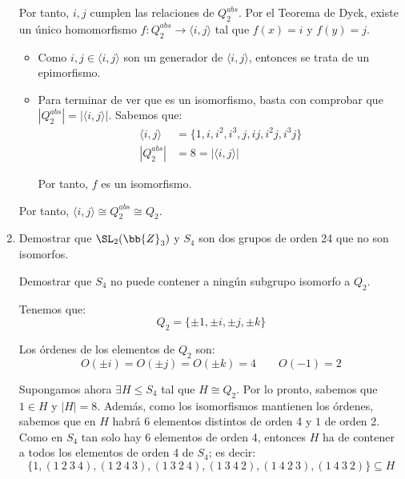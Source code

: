 \begin{ejercicio}
\begin{enumerate}
        Por tanto, $i,j$ cumplen las relaciones de $Q_2^{abs}$. Por el Teorema de Dyck, existe un único homomorfismo $f:Q_2^{abs}\to\langle i,j\rangle$ tal que $f(x)=i$ y $f(y)=j$.
        \begin{itemize}
            \item Como $i,j\in\langle i,j\rangle$ son un generador de $\langle i,j\rangle$, entonces se trata de un epimorfismo.
            \item Para terminar de ver que es un isomorfismo, basta con comprobar que $|Q_2^{abs}|=|\langle i,j\rangle|$. Sabemos que:
            \begin{align*}
                \langle i,j\rangle &= \{1,i,i^2,i^3,j,ij,i^2j,i^3j\}\\
                |Q_2^{abs}| &= 8 = |\langle i,j\rangle|
            \end{align*}

            Por tanto, $f$ es un isomorfismo.
        \end{itemize}
        Por tanto, $\langle i,j\rangle\cong Q_2^{abs}\cong Q_2$.
        \item Demostrar que $\SL_2(\bb{Z}_3)$ y $S_4$ son dos grupos de orden 24 que no son isomorfos.
        \begin{observacion}
            Demostrar que $S_4$ no puede contener a ningún subgrupo isomorfo a $Q_2$.
        \end{observacion}
        
        Tenemos que:
        \begin{equation*}
            Q_2 = \{\pm 1, \pm i, \pm j, \pm k\}
        \end{equation*}

        Los órdenes de los elementos de $Q_2$ son:
        \begin{equation*}
            O(\pm i)= O(\pm j)= O(\pm k)=4\qquad O(-1)=2
        \end{equation*}

        Supongamos ahora $\exists H\leq S_4$ tal que $H\cong Q_2$. Por lo pronto, sabemos que $1\in H$ y $|H|=8$.
        Además, como los isomorfismos mantienen los órdenes, sabemos que en $H$ habrá $6$ elementos distintos de orden 4 y $1$ de orden 2. Como en $S_4$ tan solo hay $6$ elementos de orden 4, entonces $H$ ha de contener a todos los elementos de orden 4 de $S_4$; es decir:
        \begin{equation*}
            \{1, (1\ 2\ 3\ 4), (1\ 2\ 4\ 3), (1\ 3\ 2\ 4), (1\ 3\ 4\ 2), (1\ 4\ 2\ 3), (1\ 4\ 3\ 2)\}\subseteq H
        \end{equation*}


\end{enumerate}
\end{ejercicio}
